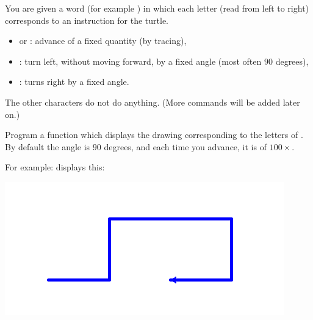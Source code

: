 \documentclass[11pt,class=report,crop=false]{standalone}
\begin{document}

\begin{activite}


You are given a word (for example ) in which each letter (read from left to right) corresponds to an instruction for the \Python{} turtle.

\begin{itemize}
  \item {} or : advance of a fixed quantity (by tracing),
  \item {}: turn left, without moving forward, by a fixed angle (most often $90$ degrees),
  \item {}: turns right by a fixed angle.
\end{itemize}

The other characters do not do anything. (More commands will be added later on.)

Program a function 
which displays the drawing corresponding to the letters of . By default the angle is $90$ degrees, and each time you advance, it is of $100 \times$.

For example:  displays this:
\begin{center}
\includegraphics[scale=\myscale,scale=0.6]{screen-lsystems-1}
\end{center}

\end{activite}


\end{document}
